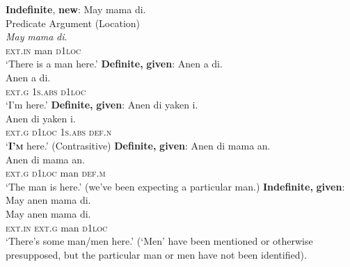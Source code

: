 \ea
\label{bkm:Ref329888024} 
\textbf{Indefinite}, \textbf{new}: May  mama  di. \\\smallskip
\glll \textnormal{Predicate}  \textnormal{Argument}  \textnormal{(Location)} \\
\textit{May}  \textit{mama}  \textit{di}. \\
\textsc{ext.in}  man  \textsc{d}1\textsc{loc} \\
\glt  ‘There is a man here.’
\z
\ea
\label{bkm:Ref329888060}
\textbf{Definite,} \textbf{given}:    Anen  a  di. \\\smallskip
\gll Anen  a  di. \\
\textsc{ext.g}  1\textsc{s.abs}  \textsc{d}1\textsc{loc} \\
\glt `I’m here.’
\z
\ea
{}
\textbf{Definite,} \textbf{given}:    Anen  di  yaken  i. \\\smallskip
\gll Anen  di  yaken  i. \\
\textsc{ext.g}  \textsc{d}1\textsc{loc}  1\textsc{s.abs}  \textsc{def.n} \\
\glt  ‘\textbf{\textsc{I’m}} here.’ (Contrasitive)
\z
\ea
\label{bkm:Ref442643960}
\textbf{Definite,} \textbf{given}:  Anen  di  mama  an. \\\smallskip
\gll Anen  di  mama  an. \\
\textsc{ext.g  d}1\textsc{loc}  man  \textsc{def.m} \\
\glt ‘The man is here.’ (we’ve been expecting a particular man.)
\z
\ea
\label{bkm:Ref329888090} 
\textbf{Indefinite,} \textbf{given}:  May   anen  mama  di. \\\smallskip
\gll May   anen  mama  di. \\
\textsc{ext.in}  \textsc{ext.g}  man  \textsc{d}1\textsc{loc} \\
\glt ‘There’s some man/men here.’ (‘Men’ have been mentioned or otherwise presupposed, but the particular man or men have not been identified).
\z

